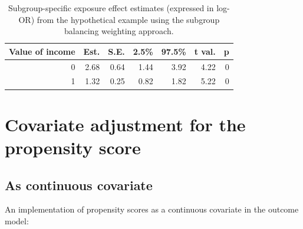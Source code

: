 \documentclass[
  letterpaper,
  DIV=11,
  numbers=noendperiod]{scrreprt}
\begin{document}
\hypertarget{tbl-w-balance}{}
\begin{table}[!h]
\caption{\label{tbl-w-balance}Subgroup-specific exposure effect estimates (expressed in log-OR) from
the hypothetical example using the subgroup balancing weighting
approach. }\tabularnewline

\centering
\begin{tabular}{rrrrrrr}
\toprule
Value of income & Est. & S.E. & 2.5\% & 97.5\% & t val. & p\\
\midrule
0 & 2.68 & 0.64 & 1.44 & 3.92 & 4.22 & 0\\
1 & 1.32 & 0.25 & 0.82 & 1.82 & 5.22 & 0\\
\bottomrule
\end{tabular}
\end{table}

\hypertarget{covariate-adjustment-for-the-propensity-score}{%
\section{Covariate adjustment for the propensity
score}\label{covariate-adjustment-for-the-propensity-score}}

\hypertarget{as-continuous-covariate}{%
\subsection{As continuous covariate}\label{as-continuous-covariate}}

An implementation of propensity scores as a continuous covariate in the
outcome model:
\end{document}
